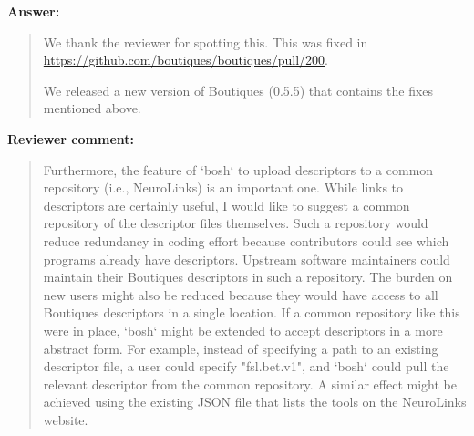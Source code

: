\documentclass[a4]{article}
\newenvironment{review}%
{\textbf{Reviewer comment:}\begin{quote}}%
{\end{quote}}%
\newenvironment{answer}%
{\textbf{Answer:}\begin{quote}}%
{\end{quote}}%
\begin{document}
\begin{answer}
  We thank the reviewer for spotting this. This was fixed in
  \url{https://github.com/boutiques/boutiques/pull/200}.

  We released a
  new version of Boutiques (0.5.5) that contains the fixes 
  mentioned above.
\end{answer}

\begin{review}
Furthermore, the feature of `bosh` to upload descriptors to a common repository (i.e., NeuroLinks) is an important one. While links to descriptors are certainly useful, I would like to suggest a common repository of the descriptor files themselves. Such a repository would reduce redundancy in coding effort because contributors could see which programs already have descriptors. Upstream software maintainers could maintain their Boutiques descriptors in such a repository. The burden on new users might also be reduced because they would have access to all Boutiques descriptors in a single location. If a common repository like this were in place, `bosh` might be extended to accept descriptors in a more abstract form. For example, instead of specifying a path to an existing descriptor file, a user could specify "fsl.bet.v1", and `bosh` could pull the relevant descriptor from the common repository. A similar effect might be achieved using the existing JSON file that lists the
tools on the NeuroLinks website.
\end{review}
\end{document}

